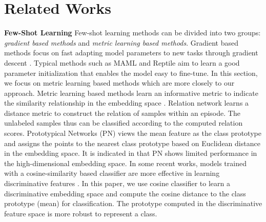 \documentclass[runningheads]{llncs}
\begin{document}
\section{Related Works}
\textbf{Few-Shot Learning}
Few-shot learning methods can be divided into two groups: \textit{gradient based methods} and \textit{metric learning based methods}. 
Gradient based methods focus on fast adapting model parameters to new tasks through gradient descent \cite{andrychowicz2016learning,finn2017model,li2017meta,nichol2018on,rusu2019meta,lee2019meta}. Typical methods such as MAML \cite{finn2017model} and Reptile \cite{nichol2018on} aim to learn a good parameter initialization that enables the model easy to fine-tune. 
In this section, we focus on metric learning based methods which are more closely to our approach. Metric learning based methods learn an informative metric to indicate the similarity relationship in the embedding space \cite{vinyals2016matching,snell2017prototypical,sung2018learning,allen2019infinite}. 
Relation network \cite{sung2018learning} learns a distance metric to construct the relation of samples within an episode. The unlabeled samples thus can be classified according to the computed relation scores. Prototypical Networks (PN) \cite{snell2017prototypical} views the mean feature as the class prototype and assigns the points to the nearest class prototype based on Euclidean distance in the embedding space. It is indicated in \cite{lee2019meta} that PN shows limited performance in the high-dimensional embedding space.
In some recent works, models trained with a cosine-similarity based classifier are more effective in learning discriminative features \cite{gidaris2018dynamic,chen2019a}. 
In this paper, we use cosine classifier to learn a discriminative embedding space and compute the cosine distance to the class prototype (mean) for classification. The prototype computed in the discriminative feature space is more robust to represent a class.
\end{document}
